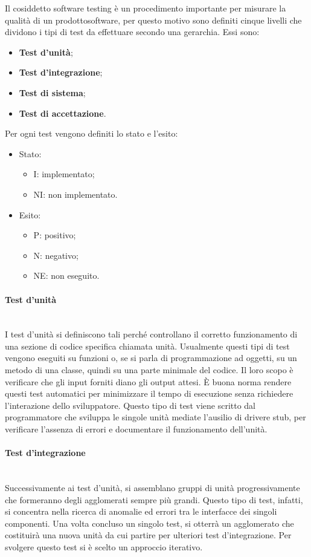 Il cosiddetto software testing è un procedimento importante per misurare la qualità di un prodotto\glosp software, per questo motivo sono definiti cinque livelli che dividono i tipi di test da effettuare secondo una gerarchia. Essi sono: 
\begin{itemize}
	\item \textbf{Test d'unità};
	\item \textbf{Test d'integrazione};
	\item \textbf{Test di sistema};
	\item \textbf{Test di accettazione}.
\end{itemize}
Per ogni test vengono definiti lo stato e l'esito:
\begin{itemize}
	\item Stato:
	\begin{itemize}
		\item I: implementato;
		\item NI: non implementato.
	\end{itemize}
	\item Esito:
	\begin{itemize}
		\item P: positivo;
		\item N: negativo;
		\item NE: non eseguito.
	\end{itemize}
\end{itemize}

\paragraph*{Test d'unità} \mbox{}\\ [1mm]
I test d'unità si definiscono tali perché controllano il corretto funzionamento di una sezione di codice specifica chiamata unità. Usualmente questi tipi di test vengono eseguiti su funzioni o, se si parla di programmazione ad oggetti, su un metodo di una classe, quindi su una parte minimale del codice. Il loro scopo è verificare che gli input forniti diano gli output attesi. È buona norma rendere questi test automatici per minimizzare il tempo di esecuzione senza richiedere l'interazione dello sviluppatore. Questo tipo di test viene scritto dal programmatore che sviluppa le singole unità mediate l'ausilio di driver\glosp e stub\glo, per verificare l'assenza di errori e documentare il funzionamento dell'unità.

\paragraph*{Test d'integrazione} \mbox{}\\ [1mm]
Successivamente ai test d'unità, si assemblano gruppi di unità progressivamente che formeranno degli agglomerati sempre più grandi. Questo tipo di test, infatti, si concentra nella ricerca di anomalie ed errori tra le interfacce dei singoli componenti. Una volta concluso un singolo test, si otterrà un agglomerato che costituirà una nuova unità da cui partire per ulteriori test d'integrazione. Per svolgere questo test si è scelto un approccio iterativo.

